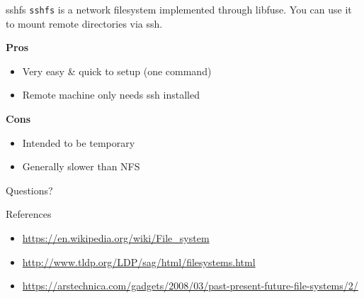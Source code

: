 \documentclass{lug}
\begin{document}
\begin{frame}{sshfs}
\texttt{sshfs} is a network filesystem implemented through libfuse. You can
use it to mount remote directories via ssh.

\textbf{Pros}\begin{itemize}
    \item Very easy \& quick to setup (one command)
    \item Remote machine only needs ssh installed
\end{itemize}

\textbf{Cons}\begin{itemize}
    \item Intended to be temporary
    \item Generally slower than NFS
\end{itemize}
\end{frame}

\begin{frame}[standout]
    \Huge
    Questions?
\end{frame}

\begin{frame}{References}
    \begin{itemize}
        \item \url{https://en.wikipedia.org/wiki/File_system}
        \item \url{http://www.tldp.org/LDP/sag/html/filesystems.html}
        \item \url{https://arstechnica.com/gadgets/2008/03/past-present-future-file-systems/2/}
    \end{itemize}
\end{frame}
\end{document}

